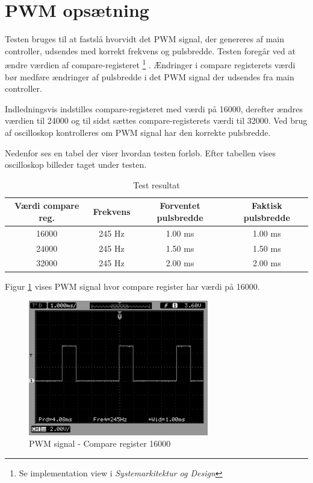 \section{PWM opsætning}

Testen bruges til at fastslå hvorvidt det PWM signal, der genereres af main controller, udsendes med korrekt frekvens og pulsbredde. Testen foregår ved at ændre værdien af compare-registeret \footnote{Se implementation view i \textit{Systemarkitektur og Design}} . Ændringer i compare registerets værdi bør medføre ændringer af pulsbredde i det PWM signal der udsendes fra main controller. 

Indledningsvis indstilles compare-registeret med værdi på 16000, derefter ændres værdien til 24000 og til sidst sættes compare-registerets værdi til 32000. Ved brug af oscilloskop kontrolleres om PWM signal har den korrekte pulsbredde. 

Nedenfor ses en tabel der viser hvordan testen forløb. Efter tabellen vises oscilloskop billeder taget under testen. 

\vspace{0.50cm}

\begin{table}[H]
	\centering
		\begin{tabular}{|c|c|c|c|}
			\hline
			Værdi compare reg. & Frekvens & Forventet pulsbredde & Faktisk pulsbredde \\ \hline
			16000 & 245 Hz & 1.00 ms & 1.00 ms \\ \hline			
			24000 & 245 Hz & 1.50 ms & 1.50 ms \\ \hline
			32000 & 245 Hz & 2.00 ms & 2.00 ms \\ \hline
		\end{tabular}
	\caption{Test resultat}
\end{table}

\vspace{0.50cm}

Figur \ref{fig:PWM_1} vises PWM signal hvor compare register har værdi på 16000. 

\begin{figure}[H]
\centering
\includegraphics[width=0.7\textwidth]{Billeder/Test/PWM_16000.png}
\vspace{-0.0cm}
\caption{PWM signal - Compare register 16000}
\label{fig:PWM_1}
\end{figure}


